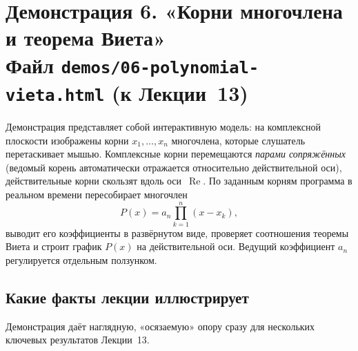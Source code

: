 \section*{Демонстрация 6. «Корни многочлена и теорема Виета»\\ \normalsize\textmd{Файл \texttt{demos/06-polynomial-vieta.html} \quad(к Лекции~13)}}

Демонстрация представляет собой интерактивную модель: на комплексной
плоскости изображены корни $x_1, \dots, x_n$ многочлена, которые
слушатель перетаскивает мышью. Комплексные корни перемещаются
\emph{парами сопряжённых} (ведомый корень автоматически отражается
относительно действительной оси), действительные корни скользят вдоль
оси~$\operatorname{Re}$. По заданным корням программа в реальном
времени пересобирает многочлен
\[
  P(x) = a_n \prod_{k=1}^{n} (x - x_k),
\]
выводит его коэффициенты в развёрнутом виде, проверяет соотношения
теоремы Виета и строит график $P(x)$ на действительной оси. Ведущий
коэффициент $a_n$ регулируется отдельным ползунком.

\subsection*{Какие факты лекции иллюстрирует}

Демонстрация даёт наглядную, «осязаемую» опору сразу для нескольких
ключевых результатов Лекции~13.

